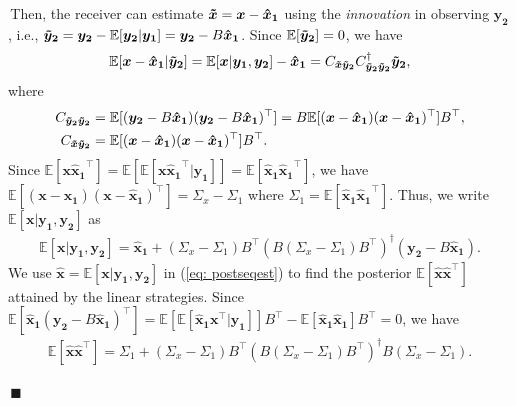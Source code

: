 \documentclass[12pt,journal,onecolumn]{IEEEtran}
\newenvironment{Proof}[1]{\medskip\par\noindent{\bf Proof:\,}\,#1}{{\mbox{\,$\blacksquare$}\par}}
\newcommand{\mbnote}[1]{\noindent{\leavevmode\color{blue}[Melih -- #1]}}
\begin{document}
\begin{Proof}
Then, the receiver can estimate $\boldsymbol{\Tilde{x}}=\boldsymbol{x}-\boldsymbol{\hat{x}_1}$ using the \textit{innovation} in observing $\boldsymbol{y_2}$, i.e., $\boldsymbol{\Tilde{y}_2}=\boldsymbol{y_2}-\mathbb{E}[\boldsymbol{y_2}|\boldsymbol{y_1}]=\boldsymbol{y_2}-B\boldsymbol{\hat{x}_1}$. Since $\mathbb{E}[\boldsymbol{\Tilde{y}_2}]=0$, we have
\begin{align*}
    \mathbb{E}[\boldsymbol{x}-\boldsymbol{\hat{x}_1}|\boldsymbol{\Tilde{y}_2}]=\mathbb{E}[\boldsymbol{x}|\boldsymbol{y_1},\boldsymbol{y_2}]-\boldsymbol{\hat{x}_1}=C_{\boldsymbol{\Tilde{x}}\boldsymbol{\Tilde{y}_2}}C^{\dagger}_{\boldsymbol{\Tilde{y}_2}\boldsymbol{\Tilde{y}_2}}\boldsymbol{\Tilde{y}_2},
\end{align*}
where
\begin{align*}
    C_{\boldsymbol{\Tilde{y}_2}\boldsymbol{\Tilde{y}_2}}&=\mathbb{E}[(\boldsymbol{y_2}-B\boldsymbol{\hat{x}_1})(\boldsymbol{y_2}-B\boldsymbol{\hat{x}_1})^\top]=B\mathbb{E}[(\boldsymbol{x}-\boldsymbol{\hat{x}_1})(\boldsymbol{x}-\boldsymbol{\hat{x}_1})^\top]B^\top,\\
    C_{\boldsymbol{\Tilde{x}}\boldsymbol{\Tilde{y}_2}}&=\mathbb{E}[(\boldsymbol{x}-\boldsymbol{\hat{x}_1})(\boldsymbol{x}-\boldsymbol{\hat{x}_1})^\top]B^\top.
\end{align*}
Since $\mathbb{E}[\boldsymbol{x}\boldsymbol{\hat{x}_1}^\top]=\mathbb{E}[\mathbb{E}[\boldsymbol{x}\boldsymbol{\hat{x}_1}^\top|\boldsymbol{y_1}]]=\mathbb{E}[\boldsymbol{\hat{x}_1}\boldsymbol{\hat{x}_1}^\top]$, we have $\mathbb{E}[(\boldsymbol{x}-\boldsymbol{\hat{x}_1})(\boldsymbol{x}-\boldsymbol{\hat{x}_1})^\top]=\Sigma_x-\Sigma_1$ where $\Sigma_1=\mathbb{E}[\boldsymbol{\hat{x}_1}\boldsymbol{\hat{x}_1}^\top]$. Thus, we write $\mathbb{E}[\boldsymbol{x}|\boldsymbol{y_1},\boldsymbol{y_2}]$ as
\begin{align}\label{eq: postseqest}
    \mathbb{E}[\boldsymbol{x}|\boldsymbol{y_1},\boldsymbol{y_2}]=\boldsymbol{\hat{x}_1}+(\Sigma_x-\Sigma_1)B^\top(B(\Sigma_x-\Sigma_1)B^\top)^{\dagger}(\boldsymbol{y_2}-B\boldsymbol{\hat{x}_1}).
\end{align}
We use $\boldsymbol{\hat{x}} =\mathbb{E}[\boldsymbol{x}|\boldsymbol{y_1},\boldsymbol{y_2}]$ in (\ref{eq: postseqest}) to find the posterior $\mathbb{E}[\boldsymbol{\hat{x}}\boldsymbol{\hat{x}}^\top]$ attained by the linear strategies. Since $\mathbb{E}[\boldsymbol{\hat{x}_1}(\boldsymbol{y_2}-B\boldsymbol{\hat{x}_1})^\top]=\mathbb{E}[\mathbb{E}[\boldsymbol{\hat{x}_1}\boldsymbol{x}^\top|\boldsymbol{y_1}]]B^\top-\mathbb{E}[\boldsymbol{\hat{x}_1}\boldsymbol{\hat{x}_1}]B^\top=0$, we have
\begin{align}\label{eqn:thm_1}
    \mathbb{E}[\boldsymbol{\hat{x}}\boldsymbol{\hat{x}}^\top]=\Sigma_1+(\Sigma_x-\Sigma_1)B^\top(B(\Sigma_x-\Sigma_1)B^\top)^{\dagger}B(\Sigma_x-\Sigma_1).
\end{align}


\end{Proof}
\end{document}

